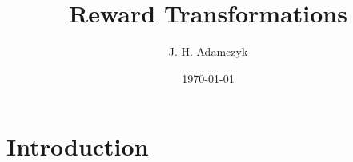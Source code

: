 \documentclass{article}
\title{Reward Transformations}
\author{J. H. Adamczyk }
\date{\today}
\theoremstyle{plain}
\theoremstyle{definition}
\theoremstyle{remark}
\begin{document}
\maketitle

\section{Introduction}



% 
\end{document}
